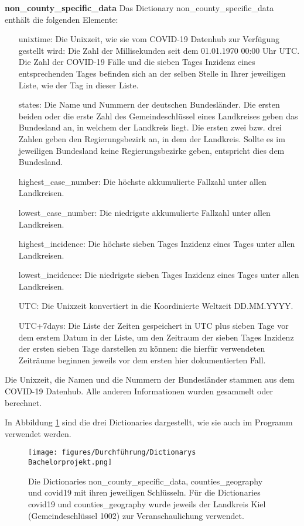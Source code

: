 \textbf{non\_county\_specific\_data}
Das Dictionary non\_county\_specific\_data enthält die folgenden Elemente:
\begin{itemize}
    \item[unixtime:] Die Unixzeit, wie sie vom COVID-19 Datenhub zur Verfügung gestellt wird: Die Zahl der Millisekunden seit dem 01.01.1970 00:00 Uhr UTC. Die Zahl der COVID-19 Fälle und die sieben Tages Inzidenz eines entsprechenden Tages befinden sich an der selben Stelle in Ihrer jeweiligen Liste, wie der Tag in dieser Liste.
    \item[states:] Die Name und Nummern der deutschen Bundesländer. Die ersten beiden oder die erste Zahl des Gemeindeschlüssel eines Landkreises geben das Bundesland an, in welchem der Landkreis liegt. Die ersten zwei bzw. drei Zahlen geben den Regierungsbezirk an, in dem der Landkreis. Sollte es im jeweiligen Bundesland keine Regierungsbezirke geben, entspricht dies dem Bundesland.
    \item[highest\_case\_number:] Die höchste akkumulierte Fallzahl unter allen Landkreisen.
    \item[lowest\_case\_number:] Die niedrigste akkumulierte Fallzahl unter allen Landkreisen.
    \item[highest\_incidence:] Die höchste sieben Tages Inzidenz eines Tages unter allen Landkreisen.
    \item[lowest\_incidence:] Die niedrigste sieben Tages Inzidenz eines Tages unter allen Landkreisen.
    \item[UTC:] Die Unixzeit konvertiert in die Koordinierte Weltzeit \glqq{}DD.MM.YYYY\grqq{}.
    \item[UTC+7days:] Die Liste der Zeiten gespeichert in UTC plus sieben Tage vor dem erstem Datum in der Liste, um den Zeitraum der sieben Tages Inzidenz der ersten sieben Tage darstellen zu können: die hierfür verwendeten Zeiträume beginnen jeweils vor dem ersten hier dokumentierten Fall.
\end{itemize}
Die Unixzeit, die Namen und die Nummern der Bundesländer stammen aus dem \glqq{}COVID-19 Datenhub\grqq{}. Alle anderen Informationen wurden gesammelt oder berechnet.

In Abbildung \ref{fig:dicts_als_code} sind die drei Dictionaries dargestellt, wie sie auch im Programm verwendet werden.
\begin{figure}[H]
    \centering
    \texttt{[image: figures/Durchführung/Dictionarys Bachelorprojekt.png]}
    \caption{
    Die Dictionaries non\_county\_specific\_data, counties\_geography und covid19 mit ihren jeweiligen Schlüsseln.
    Für die Dictionaries covid19 und counties\_geography wurde jeweils der Landkreis Kiel (Gemeindeschlüssel 1002) zur Veranschaulichung verwendet.}
    \label{fig:dicts_als_code}
\end{figure}